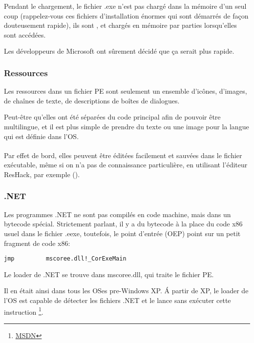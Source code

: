 Pendant le chargement, le fichier .exe n'est pas chargé dans la mémoire d'un seul
coup (rappelez-vous ces fichiers d'installation énormes qui sont démarrés de façon
douteusement rapide), ils sont , et chargés en mémoire par parties lorsqu'elles
sont accédées.

Les développeurs de Microsoft ont sûrement décidé que ça serait plus rapide.

\subsubsection{Ressources}

\label{PEresources}

Les ressources dans un fichier PE sont seulement un ensemble d'icônes, d'images,
de chaînes de texte, de descriptions de boîtes de dialogues.

Peut-être qu'elles ont été séparées du code principal afin de pouvoir être multilingue,
et il est plus simple de prendre du texte ou une image pour la langue qui est définie
dans l'\ac{OS}. \\
\\
Par effet de bord, elles peuvent être éditées facilement et sauvées dans le fichier
exécutable, même si on n'a pas de connaissance particulière, en utilisant l'éditeur
ResHack, par exemple ().

\subsubsection{.NET}


Les programmes .NET ne sont pas compilés en code machine, mais dans un bytecode spécial.
Strictement parlant, il y a du bytecode à la place du code x86 usuel dans le fichier
.eexe, toutefois, le point d'entrée (\ac{OEP}) point sur un petit fragment de code
x86:

\begin{lstlisting}
jmp         mscoree.dll!_CorExeMain
\end{lstlisting}

Le loader de .NET se trouve dans mscoree.dll, qui traite le fichier PE.

Il en était ainsi dans tous les \ac{OS}es pre-Windows XP. Á partir de XP, le loader
de l'\ac{OS} est capable de détecter les fichiers .NET et le lance sans exécuter
cette instruction \JMP
\footnote{\href{http://go.yurichev.com/17051}{MSDN}}.

